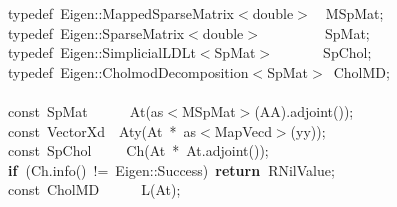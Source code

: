 \documentclass[shortnames,article,nojss]{jss}
\newcommand{\hlstd}[1]{\textcolor[rgb]{0,0,0}{#1}}
\newcommand{\hlopt}[1]{\textcolor[rgb]{0,0,0}{#1}}
\newcommand{\hlkwa}[1]{\textcolor[rgb]{0.61,0.13,0.93}{\bf{#1}}}
\newcommand{\hlkwb}[1]{\textcolor[rgb]{0.13,0.54,0.13}{#1}}
\newcommand{\hlkwc}[1]{\textcolor[rgb]{0,0,1}{#1}}
\newcommand{\hlkwd}[1]{\textcolor[rgb]{0,0,0}{#1}}
\begin{document}
\begin{figure}[htb]
    \noindent
    \ttfamily
    \hlstd{}\hlkwc{typedef\ }\hlstd{Eigen}\hlopt{::}\hlstd{MappedSparseMatrix}\hlopt{$<$}\hlstd{}\hlkwb{double}\hlstd{}\hlopt{$>$}\hlstd{\ \ }\hlopt{}\hlstd{MSpMat}\hlopt{;}\hspace*{\fill}\\
    \hlstd{}\hlkwc{typedef\ }\hlstd{Eigen}\hlopt{::}\hlstd{SparseMatrix}\hlopt{$<$}\hlstd{}\hlkwb{double}\hlstd{}\hlopt{$>$}\hlstd{\ \ \ \ \ \ \ \ \ }\hlopt{}\hlstd{SpMat}\hlopt{;}\hspace*{\fill}\\
    \hlstd{}\hlkwc{typedef\ }\hlstd{Eigen}\hlopt{::}\hlstd{SimplicialLDLt}\hlopt{$<$}\hlstd{SpMat}\hlopt{$>$}\hlstd{\ \ \ \ \ \ \ }\hlopt{}\hlstd{SpChol}\hlopt{;}\hspace*{\fill}\\
    \hlstd{}\hlkwc{typedef\ }\hlstd{Eigen}\hlopt{::}\hlstd{CholmodDecomposition}\hlopt{$<$}\hlstd{SpMat}\hlopt{$>$\ }\hlstd{CholMD}\hlopt{;}\hspace*{\fill}\\
    \hlstd{}\hspace*{\fill}\\
    \hlkwb{const\ }\hlstd{SpMat}\hlstd{\ \ \ \ \ \ }\hlstd{}\hlkwd{At}\hlstd{}\hlopt{(}\hlstd{as}\hlopt{$<$}\hlstd{MSpMat}\hlopt{$>$(}\hlstd{AA}\hlopt{).}\hlstd{}\hlkwd{adjoint}\hlstd{}\hlopt{());}\hspace*{\fill}\\
    \hlstd{}\hlkwb{const\ }\hlstd{VectorXd}\hlstd{\ \ }\hlstd{}\hlkwd{Aty}\hlstd{}\hlopt{(}\hlstd{At\ }\hlopt{{*}\ }\hlstd{as}\hlopt{$<$}\hlstd{MapVecd}\hlopt{$>$(}\hlstd{yy}\hlopt{));}\hspace*{\fill}\\
    \hlstd{}\hlkwb{const\ }\hlstd{SpChol}\hlstd{\ \ \ \ \ }\hlstd{}\hlkwd{Ch}\hlstd{}\hlopt{(}\hlstd{At\ }\hlopt{{*}\ }\hlstd{At}\hlopt{.}\hlstd{}\hlkwd{adjoint}\hlstd{}\hlopt{());}\hspace*{\fill}\\
    \hlstd{}\hlkwa{if\ }\hlstd{}\hlopt{(}\hlstd{Ch}\hlopt{.}\hlstd{}\hlkwd{info}\hlstd{}\hlopt{()\ !=\ }\hlstd{Eigen}\hlopt{::}\hlstd{Success}\hlopt{)\ }\hlstd{}\hlkwa{return\ }\hlstd{R\textunderscore NilValue}\hlopt{;}\hspace*{\fill}\\
    \hlstd{}\hlkwb{const\ }\hlstd{CholMD}\hlstd{\ \ \ \ \ \ }\hlstd{}\hlkwd{L}\hlstd{}\hlopt{(}\hlstd{At}\hlopt{);}\hspace*{\fill}\\

\end{figure}
\end{document}
